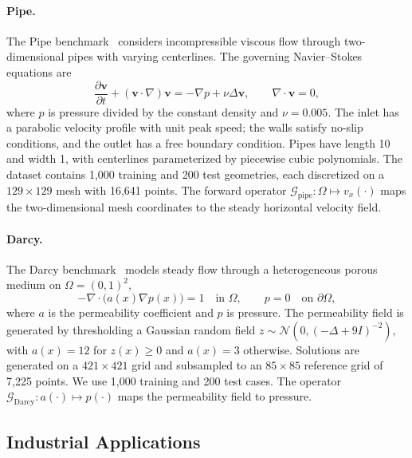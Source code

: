 \paragraph{Pipe.}
The Pipe benchmark~\citep{li2023geofno} considers incompressible viscous flow through two-dimensional pipes with varying centerlines. The governing Navier--Stokes equations are
\begin{equation}
    \frac{\partial\mathbf{v}}{\partial t}
    +(\mathbf{v}\!\cdot\nabla)\mathbf{v}
    =-\nabla p+\nu\Delta\mathbf{v},
    \qquad
    \nabla\!\cdot\mathbf{v}=0,
    \label{eq:app_pipe}
\end{equation}
where $p$ is pressure divided by the constant density and $\nu=0.005$. The inlet has a parabolic velocity profile with unit peak speed; the walls satisfy no-slip conditions, and the outlet has a free boundary condition. Pipes have length 10 and width 1, with centerlines parameterized by piecewise cubic polynomials. The dataset contains 1,000 training and 200 test geometries, each discretized on a $129\times129$ mesh with 16,641 points. The forward operator $\mathcal{G}_{\mathrm{pipe}}:\Omega\mapsto v_x(\cdot)$ maps the two-dimensional mesh coordinates to the steady horizontal velocity field.

\paragraph{Darcy.}
The Darcy benchmark~\citep{li2021fno} models steady flow through a heterogeneous porous medium on $\Omega=(0,1)^2$,
\begin{equation}
    -\nabla\!\cdot\bigl(a(x)\nabla p(x)\bigr)=1
    \quad\text{in }\Omega,
    \qquad
    p=0\quad\text{on }\partial\Omega,
    \label{eq:app_darcy}
\end{equation}
where $a$ is the permeability coefficient and $p$ is pressure. The permeability field is generated by thresholding a Gaussian random field \(z\sim\mathcal{N}(0,(-\Delta+9I)^{-2})\), with \(a(x)=12\) for \(z(x)\geq0\) and \(a(x)=3\) otherwise. Solutions are generated on a $421\times421$ grid and subsampled to an $85\times85$ reference grid of 7,225 points. We use 1,000 training and 200 test cases. The operator $\mathcal{G}_{\mathrm{Darcy}}:a(\cdot)\mapsto p(\cdot)$ maps the permeability field to pressure.

\subsection{Industrial Applications}
\label{app:industrial_benchmarks}

